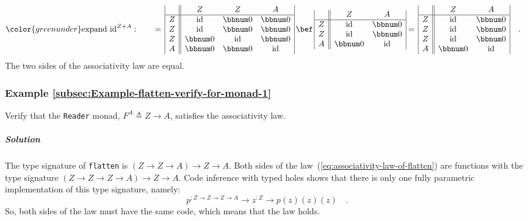 \begin{align*}
{\color{greenunder}\text{expand }\text{id}^{Z+A}:}\quad & \quad=\,\begin{array}{|c||ccc|}
 & Z & Z & A\\
\hline Z & \text{id} & \bbnum 0 & \bbnum 0\\
Z & \text{id} & \bbnum 0 & \bbnum 0\\
Z & \bbnum 0 & \text{id} & \bbnum 0\\
A & \bbnum 0 & \bbnum 0 & \text{id}
\end{array}\,\bef\,\begin{array}{|c||cc|}
 & Z & A\\
\hline Z & \text{id} & \bbnum 0\\
Z & \text{id} & \bbnum 0\\
A & \bbnum 0 & \text{id}
\end{array}=\,\begin{array}{|c||cc|}
 & Z & A\\
\hline Z & \text{id} & \bbnum 0\\
Z & \text{id} & \bbnum 0\\
Z & \text{id} & \bbnum 0\\
A & \bbnum 0 & \text{id}
\end{array}\quad.
\end{align*}
The two sides of the associativity law are equal. 

\subsubsection{Example \label{subsec:Example-flatten-verify-for-monad-1}\ref{subsec:Example-flatten-verify-for-monad-1}}

Verify that the \lstinline!Reader! monad, $F^{A}\triangleq Z\rightarrow A$,
satisfies the associativity law.

\subparagraph{Solution}

The type signature of \lstinline!flatten! is $\left(Z\rightarrow Z\rightarrow A\right)\rightarrow Z\rightarrow A$.
Both sides of the law~(\ref{eq:associativity-law-of-flatten}) are
functions with the type signature $(Z\rightarrow Z\rightarrow Z\rightarrow A)\rightarrow Z\rightarrow A$.
Code inference with typed holes shows that there is only one fully
parametric implementation of this type signature, namely:
\[
p^{:Z\rightarrow Z\rightarrow Z\rightarrow A}\rightarrow z^{:Z}\rightarrow p(z)(z)(z)\quad.
\]
So, both sides of the law must have the same code, which means that
the law holds.

